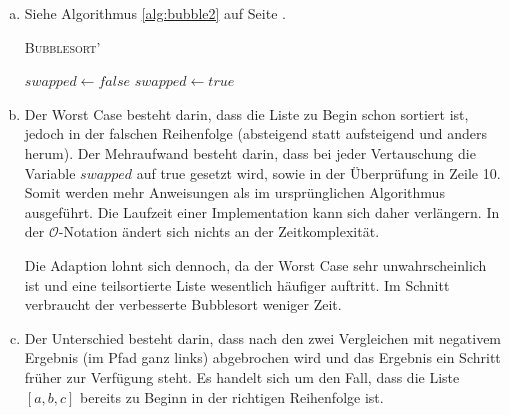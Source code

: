 \documentclass[a4paper]{scrartcl}
\begin{document}
\begin{enumerate}[(a)]
    \item Siehe Algorithmus \ref{alg:bubble2} auf Seite \pageref{alg:bubble2}.
        \begin{algorithm}[h]
            \caption{\textsc{Bubblesort'}}
            \label{alg:bubble2}
            \begin{algorithmic}[1]
                    \State $swapped \gets false$
                            \State {}
                            \State $swapped \gets true$
                        \EndIf
                    \EndFor
                        \State \Return
                    \EndIf
                \EndFor
                \EndProcedure
            \end{algorithmic}
        \end{algorithm}

    \item
        Der Worst Case besteht darin, dass die Liste zu Begin schon sortiert
        ist, jedoch in der falschen Reihenfolge (absteigend statt aufsteigend
        und anders herum).
        Der Mehraufwand besteht darin, dass bei jeder Vertauschung die
        Variable $swapped$ auf true gesetzt wird, sowie in der Überprüfung
        in Zeile 10.
        Somit werden mehr Anweisungen als im ursprünglichen Algorithmus
        ausgeführt.
        Die Laufzeit einer Implementation kann sich daher verlängern.
        In der $\mathcal{O}$-Notation ändert sich nichts an der Zeitkomplexität.

        Die Adaption lohnt sich dennoch, da der Worst Case sehr unwahrscheinlich
        ist und eine teilsortierte Liste wesentlich häufiger auftritt.
        Im Schnitt verbraucht der verbesserte Bubblesort weniger Zeit.

    \item
        Der Unterschied besteht darin, dass nach den zwei Vergleichen mit
        negativem Ergebnis (im Pfad ganz links) abgebrochen wird und das
        Ergebnis ein Schritt früher zur Verfügung steht.
        Es handelt sich um den Fall, dass die Liste $[a,b,c]$ bereits zu Beginn
        in der richtigen Reihenfolge ist.


\end{enumerate}
\end{document}
